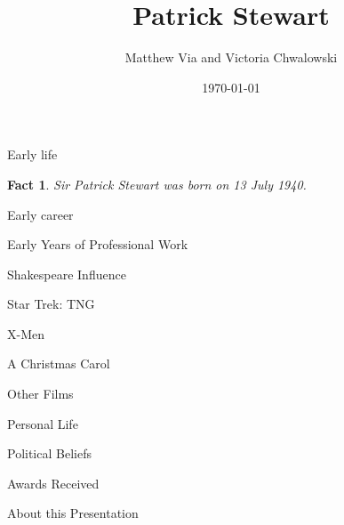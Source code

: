 \documentclass[xcolor=dvipsnames]{beamer}
\begin{document}
\author{Matthew Via and Victoria Chwalowski}
\title{Patrick Stewart}
\date{\today}
\begin{frame}{}
\titlepage
\newtheorem{fct}{Fact}

\end{frame}
\begin{frame}{Early life}
  \begin{fct}
    Sir Patrick Stewart was born on 13 July 1940.
  \end{fct}

\end{frame}
\begin{frame}{Early career}

\end{frame}
\begin{frame}{Early Years of Professional Work}

\end{frame}
\begin{frame}{Shakespeare Influence}

\end{frame}
\begin{frame}{Star Trek: TNG}

\end{frame}
\begin{frame}{X-Men}

\end{frame}
\begin{frame}{A Christmas Carol}

\end{frame}
\begin{frame}{Other Films}

\end{frame}
\begin{frame}{Personal Life}

\end{frame}
\begin{frame}{Political Beliefs}

\end{frame}
\begin{frame}{Awards Received}

\end{frame}
\begin{frame}{About this Presentation}

\end{frame}
\end{document}
